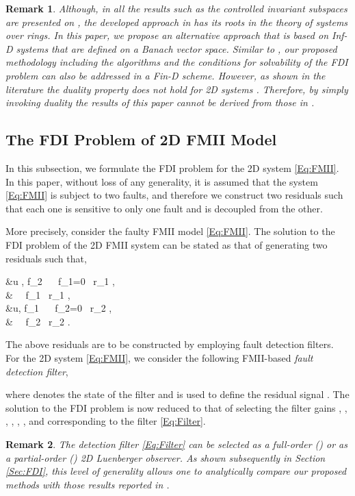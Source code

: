 \documentclass[journal,12pt,draftcls,onecolumn]{IEEEtran}
\newcommand{\bs}{\begin{small}}
\newcommand{\es}{\end{small}}
\def\QEDclosed{\hfill\IEEEQEDclosed}
\renewcommand{\qed}{\QEDclosed}
\newtheorem{remark}{Remark}
\begin{document}
\begin{remark}
	 Although, in \cite{conte1988GeometryArticle} all the results such as the controlled invariant subspaces are presented on , the developed approach in \cite{conte1988GeometryArticle} has its roots in the theory of systems over rings. In this paper, we propose an alternative approach that is based on Inf-D systems that are  defined on a Banach vector space. Similar to \cite{conte1988GeometryArticle}, our proposed methodology including the algorithms and the conditions for solvability of the FDI problem can also be addressed in a Fin-D scheme. However, as shown in the literature the duality property does not hold for 2D systems \cite{FMMinimalRealization,FMinBook}. Therefore, by simply invoking duality the results of this paper cannot be derived from those in \cite{conte1988GeometryArticle}.
\end{remark}

\subsection{The FDI  Problem of 2D FMII Model}\label{Sec:FDIProb}
In this subsection,  we formulate the FDI problem for the 2D system \eqref{Eq:FMII}. In this paper, without loss of any generality, it is assumed that the system \eqref{Eq:FMII} is subject to two faults, and therefore we construct two residuals such that each one is sensitive to only one fault and is decoupled from the other.

More precisely, consider the faulty FMII model \eqref{Eq:FMII}. The solution to the FDI problem of the 2D FMII system can be stated as that of generating two residuals  such that,

		&\forall u , f_2 \   \ f_1=0 \;\;\;  \  r_1 \nonumber, \\ &\; \ \ f_1 \;\;\;  \ r_1  \label{FDI_InObs1},\\
		&\forall u,  f_1  \   \ f_2=0 \;\;\;  \  r_2 \nonumber, \\ &\; \ \ f_2 \;\;\;  \ r_2 \label{FDI_InObs2}.
	


The above residuals are to be constructed by employing fault detection filters. For the 2D system
\eqref{Eq:FMII}, we consider the following FMII-based {\it fault detection filter},
\bs

\es
where  denotes the state of the filter and is used to define the residual signal . The solution to the FDI problem is now reduced to that of selecting the filter gains , , , , , ,  and  corresponding to the filter \eqref{Eq:Filter}.
\begin{remark}\label{Rem:GeneralFilter}
	The detection filter \eqref{Eq:Filter} can be selected as a full-order () or as a partial-order () 2D Luenberger observer.
As shown subsequently in Section \ref{Sec:FDI}, this level of generality allows one to analytically compare our proposed methods with those results reported in \cite{Malek_3DFDI}.\qed
\end{remark}
\end{document}

